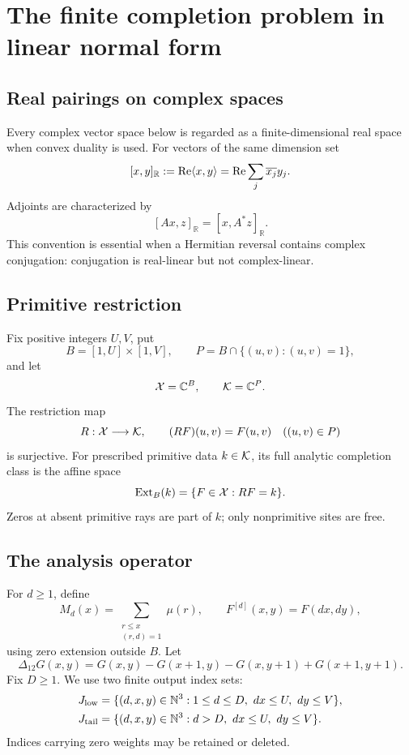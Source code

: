 \section{The finite completion problem in linear normal form}
\label{sec:finite-normal-form}

\subsection{Real pairings on complex spaces}

Every complex vector space below is regarded as a finite-dimensional real
space when convex duality is used.  For vectors of the same dimension set
\[
 [x,y]_{\mathbb R}
 :=
 \operatorname{Re}\langle x,y\rangle
 =
 \operatorname{Re}\sum_j\overline{x_j}y_j .
\]
Adjoints are characterized by
\[
 [Ax,z]_{\mathbb R}=[x,A^*z]_{\mathbb R}.
\]
This convention is essential when a Hermitian reversal contains complex
conjugation: conjugation is real-linear but not complex-linear.

\subsection{Primitive restriction}

Fix positive integers \(U,V\), put
\[
 B=[1,U]\times[1,V],
 \qquad
 P=B\cap\{(u,v):(u,v)=1\},
\]
and let
\[
 \mathcal X=\mathbb C^B,\qquad \mathcal K=\mathbb C^P.
\]
The restriction map
\[
 R:\mathcal X\longrightarrow\mathcal K,
 \qquad
 (RF)(u,v)=F(u,v)\quad((u,v)\in P)
\]
is surjective.  For prescribed primitive data \(k\in\mathcal K\), its full
analytic completion class is the affine space
\[
 \operatorname{Ext}_B(k)=\{F\in\mathcal X:RF=k\}.
\]
Zeros at absent primitive rays are part of \(k\); only nonprimitive sites
are free.

\subsection{The analysis operator}

For \(d\ge1\), define
\[
 M_d(x)=\sum_{\substack{r\le x\\(r,d)=1}}\mu(r),
 \qquad
 F^{[d]}(x,y)=F(dx,dy),
\]
using zero extension outside \(B\).  Let
\[
 \Delta_{12}G(x,y)
 =
 G(x,y)-G(x+1,y)-G(x,y+1)+G(x+1,y+1).
\]
Fix \(D\ge1\).  We use two finite output index sets:
\begin{align*}
 J_{\rm low}
 &=
 \{(d,x,y)\in\mathbb N^3:1\le d\le D,\ dx\le U,\ dy\le V\},\\
 J_{\rm tail}
 &=
 \{(d,x,y)\in\mathbb N^3:d>D,\ dx\le U,\ dy\le V\}.
\end{align*}
Indices carrying zero weights may be retained or deleted.

